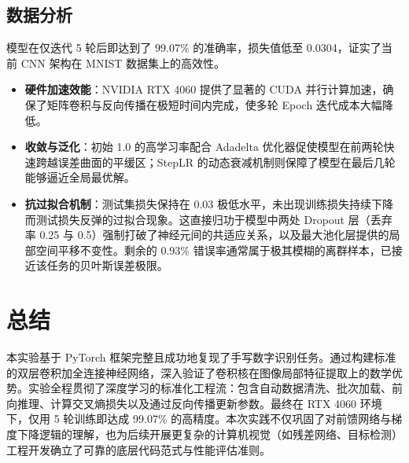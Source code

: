 \subsection{数据分析}
模型在仅迭代 5 轮后即达到了 99.07\% 的准确率，损失值低至 0.0304，证实了当前 CNN 架构在 MNIST 数据集上的高效性。
\begin{itemize}
    \item \textbf{硬件加速效能}：NVIDIA RTX 4060 提供了显著的 CUDA 并行计算加速，确保了矩阵卷积与反向传播在极短时间内完成，使多轮 Epoch 迭代成本大幅降低。
    \item \textbf{收敛与泛化}：初始 1.0 的高学习率配合 Adadelta 优化器促使模型在前两轮快速跨越误差曲面的平缓区；StepLR 的动态衰减机制则保障了模型在最后几轮能够逼近全局最优解。
    \item \textbf{抗过拟合机制}：测试集损失保持在 0.03 极低水平，未出现训练损失持续下降而测试损失反弹的过拟合现象。这直接归功于模型中两处 Dropout 层（丢弃率 0.25 与 0.5）强制打破了神经元间的共适应关系，以及最大池化层提供的局部空间平移不变性。剩余的 0.93\% 错误率通常属于极其模糊的离群样本，已接近该任务的贝叶斯误差极限。
\end{itemize}

\section{总结}
本实验基于 PyTorch 框架完整且成功地复现了手写数字识别任务\cite{pytorch_mnist_2024}。通过构建标准的双层卷积加全连接神经网络，深入验证了卷积核在图像局部特征提取上的数学优势\cite{lecun1998gradient}。实验全程贯彻了深度学习的标准化工程流：包含自动数据清洗、批次加载、前向推理、计算交叉熵损失以及通过反向传播更新参数\cite{paszke2019pytorch}。最终在 RTX 4060 环境下，仅用 5 轮训练即达成 99.07\% 的高精度。本次实践不仅巩固了对前馈网络与梯度下降逻辑的理解，也为后续开展更复杂的计算机视觉（如残差网络、目标检测）工程开发确立了可靠的底层代码范式与性能评估准则。
